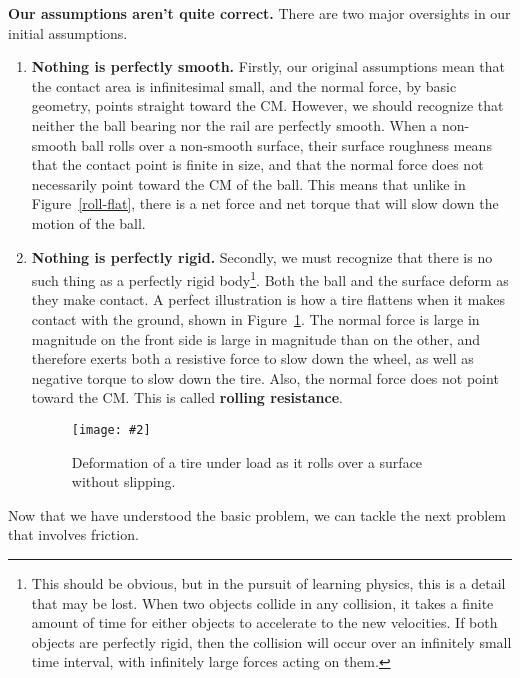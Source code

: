 \documentclass{../../../oss-handout}
\newcommand{\pic}[2]{\texttt{[image: \#2]}}
\begin{document}
\textbf{Our assumptions aren't quite correct.} There are two major oversights
in our initial assumptions.
\begin{enumerate}
\item\textbf{Nothing is perfectly smooth.} Firstly, our original assumptions
  mean that the contact area is infinitesimal small, and the normal force, by
  basic geometry, points straight toward the CM. However, we should recognize
  that neither the ball bearing nor the rail are perfectly smooth. When a
  non-smooth ball rolls over a non-smooth surface, their surface roughness
  means that the contact point is finite in size, and that the normal force
  does not necessarily point toward the CM of the ball. This means that unlike
  in Figure~\ref{roll-flat}, there is a net force and net torque that will slow
  down the motion of the ball.
\item\textbf{Nothing is perfectly rigid.} Secondly, we must recognize that
  there is no such thing as a perfectly rigid body\footnote{This should be
    obvious, but in the pursuit of learning physics, this is a detail that may
    be lost. When two objects collide in any collision, it takes a finite
    amount of time for either objects to accelerate to the new velocities. If
    both objects are perfectly rigid, then the collision will occur over an
    infinitely small time interval, with infinitely large forces acting on
    them.}. Both the ball and the surface deform as they make contact. A
  perfect illustration is how a tire flattens when it makes contact with the
  ground, shown in Figure~\ref{tire1}. The normal force is large in magnitude on
  the front side is large in magnitude than on the other, and therefore exerts
  both a resistive force to slow down the wheel, as well as negative torque to
  slow down the tire. Also, the normal force does not point toward the CM. This
  is called \textbf{rolling resistance}.
  \begin{figure}[!ht]
    \centering
    \pic{.45}{OAGZy}
    \caption{Deformation of a tire under load as it rolls over a surface
      without slipping.}
     \label{tire1}
  \end{figure}
\end{enumerate}

Now that we have understood the basic problem, we can tackle the next problem
that involves friction.
\end{document}
